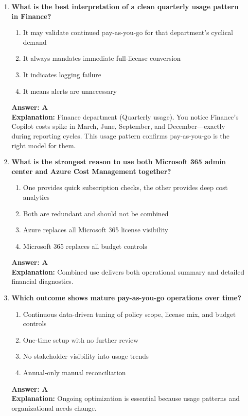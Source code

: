 \documentclass[10pt]{article}
\begin{document}
\begin{enumerate}[leftmargin=*]
\item \textbf{What is the best interpretation of a clean quarterly usage pattern in Finance?}
\begin{enumerate}[label=\Alph*.]
  \item It may validate continued pay-as-you-go for that department’s cyclical demand
  \item It always mandates immediate full-license conversion
  \item It indicates logging failure
  \item It means alerts are unnecessary
\end{enumerate}
\textbf{Answer: A}\\
\textbf{Explanation:} Finance department (Quarterly usage). You notice Finance’s Copilot costs spike in March, June, September, and December—exactly during reporting cycles. This usage pattern confirms pay-as-you-go is the right model for them.

\item \textbf{What is the strongest reason to use both Microsoft 365 admin center and Azure Cost Management together?}
\begin{enumerate}[label=\Alph*.]
  \item One provides quick subscription checks, the other provides deep cost analytics
  \item Both are redundant and should not be combined
  \item Azure replaces all Microsoft 365 license visibility
  \item Microsoft 365 replaces all budget controls
\end{enumerate}
\textbf{Answer: A}\\
\textbf{Explanation:} Combined use delivers both operational summary and detailed financial diagnostics.

\item \textbf{Which outcome shows mature pay-as-you-go operations over time?}
\begin{enumerate}[label=\Alph*.]
  \item Continuous data-driven tuning of policy scope, license mix, and budget controls
  \item One-time setup with no further review
  \item No stakeholder visibility into usage trends
  \item Annual-only manual reconciliation
\end{enumerate}
\textbf{Answer: A}\\
\textbf{Explanation:} Ongoing optimization is essential because usage patterns and organizational needs change.

\end{enumerate}
\end{document}
